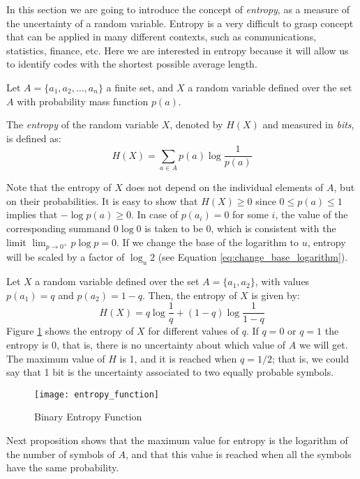 In this section we are going to introduce the concept of \emph{entropy}, as a measure of the uncertainty of a random variable. Entropy is a very difficult to grasp concept that can be applied in many different contexts, such as communications, statistics, finance, etc. Here we are interested in entropy because it will allow us to identify codes with the shortest possible average length.

Let $A = \{a_1, a_2, \ldots, a_n\}$ a finite set, and $X$ a random variable defined over the set $A$ with probability mass function $p(a)$.

\begin{definition}[Entropy]
The \emph{entropy} of the random variable $X$, denoted by $H(X)$ and measured in \emph{bits}, is defined as:
\[
H(X) = \sum_{a \in A} p(a) \log \frac{1}{p(a)}
\]
\end{definition}

Note that the entropy of $X$ does not depend on the individual elements of $A$, but on their probabilities. It is easy to show that $H(X) \geq 0$ since $0 \leq p(a) \leq 1$ implies that $-\log p(a) \geq 0$. In case of $p(a_i) = 0$ for some $i$, the value of the corresponding summand $0 \log 0$ is taken to be $0$, which is consistent with the limit $\lim_{p\to 0^+} p \log p = 0$. If we change the base of the logarithm to $u$, entropy will be scaled by a factor of $\log_u 2$ (see Equation \ref{eq:change_base_logarithm}).

\begin{example}
Let $X$ a random variable defined over the set $A = \{a_1, a_2\}$, with values $p(a_1) = q$ and $p(a_2) = 1-q$. Then, the entropy of $X$ is given by:
\[
H(X) = q \log \frac{1}{q} + (1-q) \log \frac{1}{1-q}
\]
Figure \ref{fig:entropy_function} shows the entropy of $X$ for different values of $q$. If $q=0$ or $q=1$ the entropy is 0, that is, there is no uncertainty about which value of $A$ we will get. The maximum value of $H$ is 1, and it is reached when $q=1/2$; that is, we could say that 1 bit is the uncertainty associated to two equally probable symbols.
\end{example}

\begin{figure}[h]
\centering\texttt{[image: entropy\_function]}
\caption{\label{fig:entropy_function}Binary Entropy Function}
\end{figure}

Next proposition shows that the maximum value for entropy is the logarithm of the number of symbols of $A$, and that this value is reached when all the symbols have the same probability.

